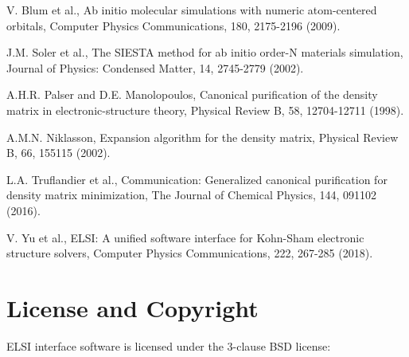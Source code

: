 \documentclass{report}
\begin{document}
\begin{thebibliography}{9}
V. Blum et al., Ab initio molecular simulations with numeric atom-centered orbitals, Computer Physics Communications, 180, 2175-2196 (2009).

J.M. Soler et al., The SIESTA method for ab initio order-N materials simulation, Journal of Physics: Condensed Matter, 14, 2745-2779 (2002).

A.H.R. Palser and D.E. Manolopoulos, Canonical purification of the density matrix in electronic-structure theory, Physical Review B, 58, 12704-12711 (1998).

A.M.N. Niklasson, Expansion algorithm for the density matrix, Physical Review B, 66, 155115 (2002).

L.A. Truflandier et al., Communication: Generalized canonical purification for density matrix minimization, The Journal of Chemical Physics, 144, 091102 (2016).

V. Yu et al., ELSI: A unified software interface for Kohn-Sham electronic structure solvers, Computer Physics Communications, 222, 267-285 (2018).

\end{thebibliography}

\chapter*{License and Copyright}
ELSI interface software is licensed under the 3-clause BSD license:
\end{document}
